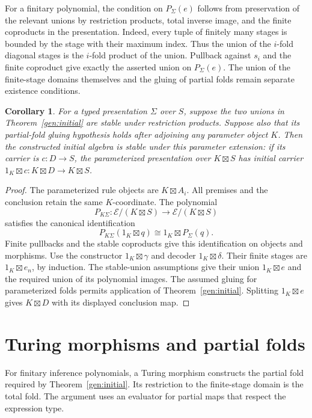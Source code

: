 \documentclass[11pt]{article}
\newtheorem{corollary}[theorem]{Corollary}
\theoremstyle{definition}
\theoremstyle{remark}
\begin{document}
For a finitary polynomial, the condition on $P_\Sigma(e)$ follows
from preservation of the relevant unions by restriction products,
total inverse image, and the finite coproducts in the presentation.
Indeed, every tuple of finitely many stages is bounded by the stage
with their maximum index. Thus the union of the $i$-fold diagonal
stages is the $i$-fold product of the union. Pullback against $s_i$
and the finite coproduct give exactly the asserted union on
$P_\Sigma(e)$. The union of the finite-stage domains themselves and
the gluing of partial folds remain separate existence conditions.

\begin{corollary}\label{gen:parameter-stability}
For a typed presentation $\Sigma$ over $S$, suppose the two unions in
Theorem~\ref{gen:initial} are stable under restriction products.
Suppose also that its partial-fold gluing hypothesis holds after adjoining
any parameter object $K$. Then the constructed initial algebra is stable
under this parameter extension: if its carrier is $c:D\to S$, the
parameterized presentation over $K\boxtimes S$ has initial carrier
$1_K\boxtimes c:K\boxtimes D\to K\boxtimes S$.
\end{corollary}
\begin{proof}
The parameterized rule objects are $K\boxtimes A_i$. All premises
and the conclusion retain the same $K$-coordinate. The polynomial
\[
 P_{K\Sigma}:\mathscr E/(K\boxtimes S)
       \longrightarrow\mathscr E/(K\boxtimes S)
\]
satisfies the canonical identification
\[
 P_{K\Sigma}(1_K\boxtimes q)
 \cong 1_K\boxtimes P_\Sigma(q).
\]
Finite pullbacks and the stable coproducts give this identification on
objects and morphisms. Use the constructor $1_K\boxtimes\gamma$
and decoder $1_K\boxtimes\delta$. Their finite stages are
$1_K\boxtimes e_n$, by induction. The stable-union assumptions give
their union $1_K\boxtimes e$ and the required union of its polynomial
images. The assumed gluing for parameterized folds permits application
of Theorem~\ref{gen:initial}. Splitting $1_K\boxtimes e$ gives
$K\boxtimes D$ with its displayed conclusion map.
\end{proof}



\section{Turing morphisms and partial folds}\label{gen:turing-fold-section}

For finitary inference polynomials, a Turing morphism constructs the
partial fold required by Theorem~\ref{gen:initial}. Its restriction to
the finite-stage domain is the total fold. The argument uses an evaluator
for partial maps that respect the expression type.
\end{document}
